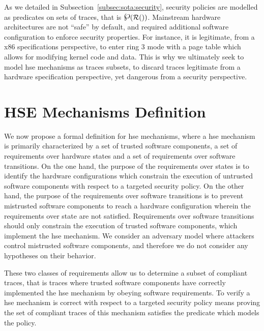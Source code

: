 As we detailed in Subsection~\ref{subsec:sota:security}, security policies are
modelled as predicates on sets of traces, that is $\powerset (\pathesLTS{Ez})$.
%
Mainstream hardware architectures are not ``safe'' by default, and required
additional software configuration to enforce security properties.
%
For instance, it is legitimate, from a x86 specifications perspective, to enter
ring 3 mode with a page table which allows for modifying kernel code and data.
%
This is why we ultimately seek to model \ac{hse} mechanisms as traces subsets,
to discard traces legitimate from a hardware specification perspective, yet
dangerous from a security perspective.

\section{HSE Mechanisms Definition}
\label{sec:speccert:hse}

We now propose a formal definition for \ac{hse} mechanisms, where a \ac{hse}
mechanism is primarily characterized by a set of trusted software components, a
set of requirements over hardware states and a set of requirements over software
transitions.
%
On the one hand, the purpose of the requirements over states is to identify the
hardware configurations which constrain the execution of untrusted software
components with respect to a targeted security policy.
%
On the other hand, the purpose of the requirements over software transitions is
to prevent mistrusted software components to reach a hardware configuration
wherein the requirements over state are not satisfied.
%
Requirements over software transitions should only constrain the execution of
trusted software components, which implement the \ac{hse} mechanism.
%
We consider an adversary model where attackers control mistrusted software
components, and therefore we do not consider any hypotheses on their behavior.

These two classes of requirements allow us to determine a subset of compliant
traces, that is traces where trusted software components have correctly
implemented the \ac{hse} mechanism by obeying software requirements.
%
%
To verify a \ac{hse} mechanism is correct with respect to a targeted security
policy means proving the set of compliant traces of this mechanism satisfies the
predicate which models the policy.


